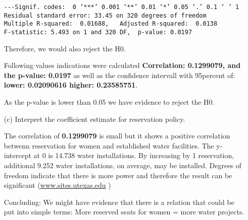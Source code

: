 \documentclass[12pt,letterpaper]{article}
\begin{document}
\begin{enumerate}
\begin{verbatim}
---Signif. codes:  0 ‘***’ 0.001 ‘**’ 0.01 ‘*’ 0.05 ‘.’ 0.1 ‘ ’ 1
Residual standard error: 33.45 on 320 degrees of freedom
Multiple R-squared:  0.01688,	Adjusted R-squared:  0.0138 
F-statistic: 5.493 on 1 and 320 DF,  p-value: 0.0197
\end{verbatim}
Therefore, we would also reject the H0.

Following values indications were calculated  \textbf{Correlation: 0.1299079, and the p-value: 0.0197} as well as the confidence intervall with 95percent of: \textbf{lower:  0.02090616 higher: 0.23585751}. \\
\begin{center}
As the p-value is lower than 0.05 we have evidence to reject the H0.
\end{center}

	\vspace{.5cm}
	\item [(c)] Interpret the coefficient estimate for reservation policy. 
	
	The correlation of \textbf{0.1299079} is small but it shows a positive correlation betwenn reservation for women and established water facilities. The y-intercept at 0 is 14.738 water installations. By increasing by 1 reservation, additional 9.252 water installations, on average, may be installed. Degrees of freedom indicate that there is more power and therefore the result can be significant (\href{	https://sites.utexas.edu/sos/degreesfreedom/#:~:text=Because%20higher%20degrees%20of%20freedom,and%20find%20a%20significant%20result.}{www.sites.utexas.edu} )
	
	Concluding: We might have evidence that there is a relation that could be put into simple terms: More reserved seats for women = more water projects.
	

	
\end{enumerate}
\end{document}
